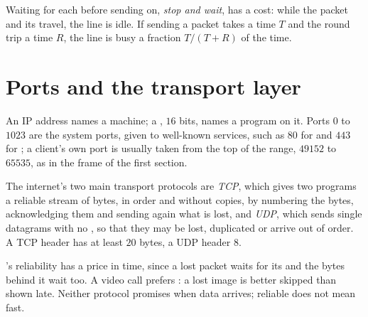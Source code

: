 Waiting for each  before sending on, \emph{stop and wait}, has a cost: while the packet and its
 travel, the line is idle. If sending a packet takes a time $T$ and the round trip a time $R$, the line
is busy a fraction $T / (T + R)$ of the time.

\label{lst:g11:network-protocols:throughput}

\label{out:g11:network-protocols:throughput}

\section{Ports and the transport layer}\label{sec:g11:network-protocols:transport}

An IP address names a machine; a , $16$ bits, names a program on it. Ports $0$ to $1023$ are the system
ports, given to well-known services, such as $80$ for  and $443$ for ; a client's own port is usually taken
from the top of the range, $49152$ to $65535$, as in the frame of the first section.

\begin{definition}\label{def:g11:network-protocols:tcp-udp}
The internet's two main transport protocols are \emph{TCP}, which gives two programs a reliable stream of
bytes, in order and without copies, by numbering the bytes, acknowledging them and sending again what is lost, and
\emph{UDP}, which sends single datagrams with no , so that they may be lost, duplicated or
arrive out of order. A TCP header has at least $20$ bytes, a UDP header $8$.
\end{definition}

's reliability has a price in time, since a lost packet waits for its  and the bytes behind it wait
too. A video call prefers : a lost image is better skipped than shown late. Neither protocol promises when data
arrives; reliable does not mean fast.

